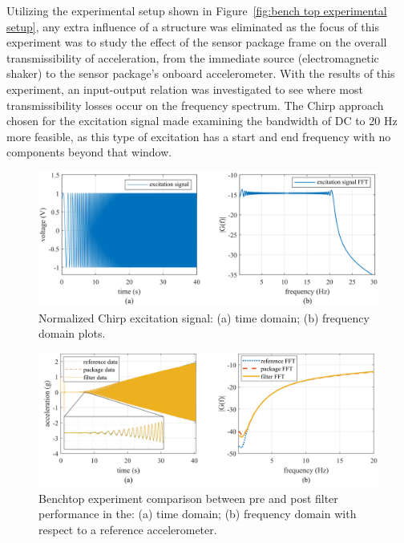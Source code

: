 \documentclass[]{spie}  %
\begin{document}
	
	Utilizing the experimental setup shown in Figure~\ref{fig:bench top experimental setup}, any extra influence of a structure was eliminated as the focus of this experiment was to study the effect of the sensor package frame on the overall transmissibility of acceleration, from the immediate source (electromagnetic shaker) to the sensor package's onboard accelerometer. With the results of this experiment, an input-output relation was investigated to see where most transmissibility losses occur on the frequency spectrum. The Chirp approach chosen for the excitation signal made examining the bandwidth of DC to 20 Hz more feasible, as this type of excitation has a start and end frequency with no components beyond that window.
	
	\begin{figure} [H]
		\centering
		\includegraphics[width=6 in]{figures/excitation signal Time and Frequency domain chirp plot.png}
		\caption{Normalized Chirp excitation signal: (a) time domain; (b) frequency domain plots.} 
		\label{fig:excitation signal Time and Frequency domain chirp plot} 
	\end{figure}

	\begin{figure} [H]
		\centering
		\includegraphics[width=6 in]{figures/Chirp Benchtop Filtered.png}
		\caption{Benchtop experiment comparison between pre and post filter performance in the: (a) time domain; (b) frequency domain with respect to a reference accelerometer.} 
		\label{fig:excitation signal plot} 
	\end{figure}
	
\end{document}
